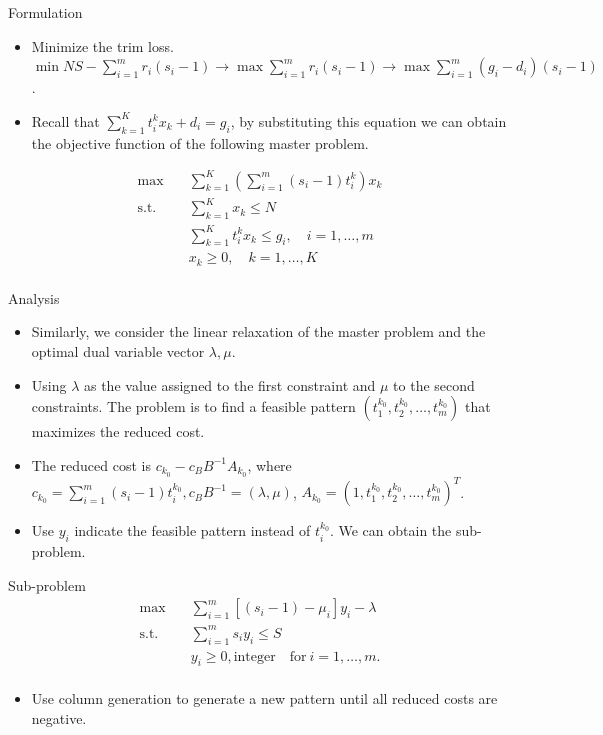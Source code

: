     \begin{frame}{Formulation}
      \begin{itemize}
        \item Minimize the trim loss. $\min NS - \sum_{i=1}^m r_i(s_i-1) \to \max \sum_{i=1}^m r_i(s_i-1) \to \max \sum_{i=1}^m (g_i - d_i)(s_i-1)$.
        \item Recall that $\sum_{k=1}^K t_i^k x_k + d_i = g_i$, by substituting this equation we can obtain the objective function of the following master problem.
      \end{itemize}
      \[\begin{split}\mbox{max}\quad & \sum_{k=1}^K(\sum_{i=1}^m (s_i-1)t_i^k) x_{k}\\
      \mbox{s.t.} \quad & \sum_{k=1}^K x_{k} \leq N \\
      & \sum_{k=1}^K t_i^k x_k \leq g_i,\quad i=1,\ldots,m\\
      & x_{k} \geq 0, \quad k = 1,\ldots,K \\
      \end{split}\]
    \end{frame}

    \begin{frame}{Analysis}
      \begin{itemize}
        \item Similarly, we consider the linear relaxation of the master problem and the optimal dual variable vector $\lambda,\mu$.
        \item Using $\lambda$ as the value assigned to the first constraint and $\mu$ to the second constraints. The problem is to find a feasible pattern $(t_1^{k_0},t_2^{k_0},\ldots, t_m^{k_0})$ that maximizes the reduced cost.
        \item The reduced cost is $c_{k_0} - c_B B^{-1}A_{k_0}$, where $c_{k_0} = \sum_{i=1}^m (s_i-1)t_i^{k_0}, c_B B^{-1} = (\lambda,\mu)$, $A_{k_0} = (1,t_1^{k_0},t_2^{k_0},\ldots,t_m^{k_0})^T$.
        \item Use $y_i$ indicate the feasible pattern instead of $t_i^{k_0}$. We can obtain the sub-problem.
      \end{itemize}
    \end{frame}

    \begin{frame}{Sub-problem}
      \[\begin{split}\mbox{max}\quad & \sum_{i=1}^m \left[(s_i-1) -\mu_i\right] y_{i} - \lambda \\
      \mbox{s.t.} \quad & \sum_{i=1}^m s_i y_i \leq S  \\
      & y_i \geq 0, \mbox{integer}\quad \mbox{for}~ i=1,\ldots,m.\\\end{split}\]
      \begin{itemize}
        \item Use column generation to generate a new pattern until all reduced costs are negative.
      \end{itemize}
    \end{frame}

